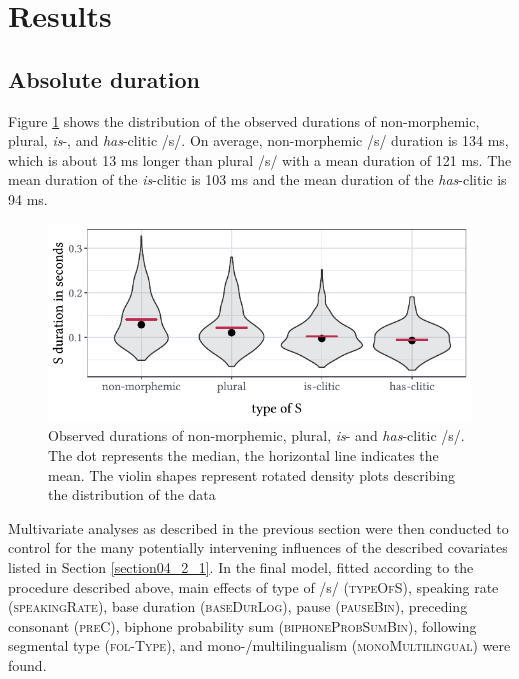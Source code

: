 \section{Results}\label{section04_3}

\subsection{Absolute duration}\label{section04_3_1}

Figure \ref{fig:4_3} shows the distribution of the observed durations of non-morphemic, plural, \textit{is}-, and \textit{has}-clitic /s/. On average, non-morphemic /s/ duration is 134 ms, which is about 13 ms longer than plural /s/ with a mean duration of 121 ms. The mean duration of the \textit{is}-clitic is 103 ms and the mean duration of the \textit{has}-clitic is 94 ms. 

\begin{figure}
    \centering
    \includegraphics[]{figures/fig4.3.pdf}
    \caption{Observed durations of non-morphemic, plural, \textit{is}- and \textit{has}-clitic /s/. The dot represents the median, the horizontal line indicates the mean. The violin shapes represent rotated density plots describing the distribution of the data}
    \label{fig:4_3}
\end{figure}

Multivariate analyses as described in the previous section were then conducted to control for the many potentially intervening influences of the described covariates listed in Section \ref{section04_2_1}. In the final model, fitted according to the procedure described above, main effects of type of /s/ (\textsc{typeOfS}), speaking rate (\textsc{speakingRate}), base duration (\textsc{baseDurLog}), pause (\textsc{pauseBin}), preceding consonant (\textsc{preC}), biphone probability sum (\textsc{biphoneProbSumBin}), following segmental type (\textsc{fol-Type}), and mono-/multilingualism (\textsc{monoMultilingual}) were found.

